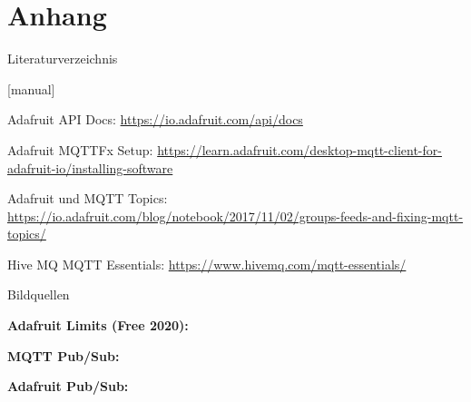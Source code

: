 \section{Anhang}

\begin{frame}{Literaturverzeichnis}
    \begin{thebibliography}{Längste Bezeichnung}
        [manual]
           
           
            \newblock Adafruit API Docs: \url{https://io.adafruit.com/api/docs}
           
            \newblock Adafruit MQTTFx Setup: \url{https://learn.adafruit.com/desktop-mqtt-client-for-adafruit-io/installing-software}
           
            \newblock Adafruit und MQTT Topics: \url{https://io.adafruit.com/blog/notebook/2017/11/02/groups-feeds-and-fixing-mqtt-topics/}
           
            \newblock Hive MQ MQTT Essentials: \url{https://www.hivemq.com/mqtt-essentials/}
                      
    \end{thebibliography}
\end{frame}

{
    \tiny
    \begin{frame}{Bildquellen}
    
          \textbf{Adafruit Limits (Free 2020):} \\
           \medskip
        
           \textbf{MQTT Pub/Sub:} \\
           \medskip
           
            \textbf{Adafruit Pub/Sub:} \\
           \medskip
        
        
        
        \end{frame}
}